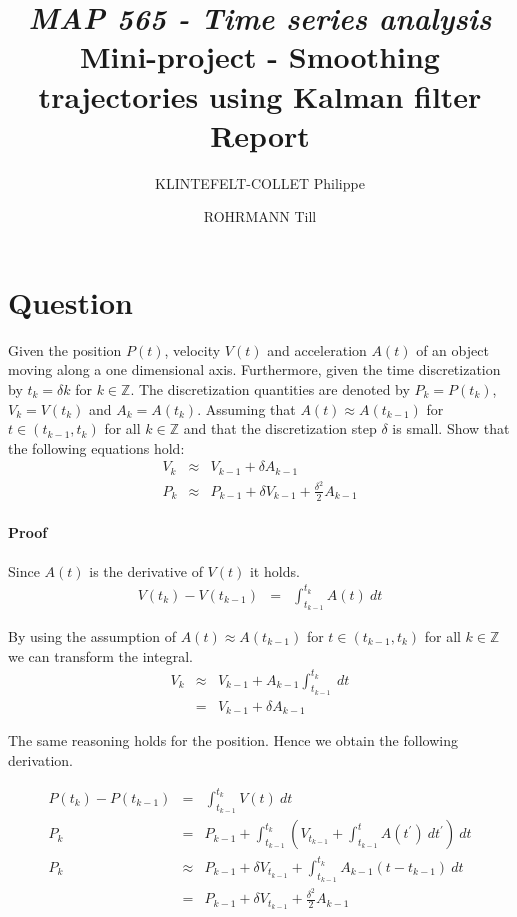 \documentclass[a4paper, 12pt, titlepage]{article}
\title
{{\em MAP 565 - Time series analysis}\\
Mini-project - Smoothing trajectories using Kalman filter\\
{\bf Report}}
\author{KLINTEFELT-COLLET Philippe \and ROHRMANN Till}
\date{}
\begin{document}
\maketitle

\section{Question}

Given the position $P(t)$, velocity $V(t)$ and acceleration $A(t)$ of an object moving along a one dimensional axis. 
Furthermore, given the time discretization by $t_k=\delta k$ for $k\in \mathbb{Z}$.
The discretization quantities are denoted by $P_k=P(t_k)$, $V_k=V(t_k)$ and $A_k=A(t_k)$.
Assuming that $A(t)\approx A(t_{k-1})$ for $t\in (t_{k-1},t_k)$ for all $k\in\mathbb{Z}$ and that the discretization step $\delta$ is small.
Show that the following equations hold:
\begin{eqnarray}
	V_k &\approx& V_{k-1} + \delta A_{k-1}\\
	P_k &\approx& P_{k-1} + \delta V_{k-1} + \frac{\delta^2}{2} A_{k-1}
\end{eqnarray}

\paragraph{Proof}

Since $A(t)$ is the derivative of $V(t)$ it holds.
\begin{eqnarray}
	V(t_k) - V(t_{k-1}) &=& \int_{t_{k-1}}^{t_k} A(t)\ dt
\end{eqnarray}

By using the assumption of $A(t)\approx A(t_{k-1})$ for $t\in (t_{k-1},t_k)$ for all $k\in\mathbb{Z}$ we can transform the integral.
\begin{eqnarray}
	V_k &\approx& V_{k-1} + A_{k-1} \int_{t_{k-1}}^{t_k}\ dt \\
	&=& V_{k-1}+\delta A_{k-1}
\end{eqnarray}

The same reasoning holds for the position. 
Hence we obtain the following derivation.

\begin{eqnarray}
	P(t_k) - P(t_{k-1}) &=& \int_{t_{k-1}}^{t_k} V(t)\ dt\\
	P_k &=& P_{k-1} + \int_{t_{k-1}}^{t_k}\left( V_{t_{k-1}} + \int_{t_{k-1}}^{t} A(t^{\prime})\ dt^{\prime}\right)\ dt\\
	P_k &\approx& P_{k-1} + \delta V_{t_{k-1}} + \int_{t_{k-1}}^{t_k} A_{k-1}(t-t_{k-1})\ dt\\
	&=& P_{k-1} + \delta V_{t_{k-1}} + \frac{\delta^2}{2} A_{k-1}	
\end{eqnarray}
\end{document}
